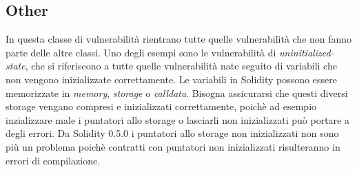 \documentclass[../../Thesis.tex]{subfiles}
\begin{document}
\subsection{Other}
In questa classe di vulnerabilit\`a rientrano tutte quelle vulnerabilit\`a che non fanno parte delle altre classi. Uno degli esempi sono le vulnerabilit\`a di \emph{uninitialized-state}, che si riferiscono a tutte quelle vulnerabilit\`a nate seguito di variabili che non vengono inizializzate correttamente. Le variabili in Solidity possono essere memorizzate in \emph{memory}, \emph{storage} o \emph{calldata}. Bisogna assicurarsi che questi diversi storage vengano compresi e inizializzati correttamente, poich\`e ad esempio inzializzare male i puntatori allo storage o lasciarli non inizializzati pu\`o portare a degli errori. Da Solidity 0.5.0 i puntatori allo storage non inizializzati non sono pi\`u un problema poich\`e contratti con puntatori non inizializzati risulteranno in errori di compilazione.  
\end{document}
